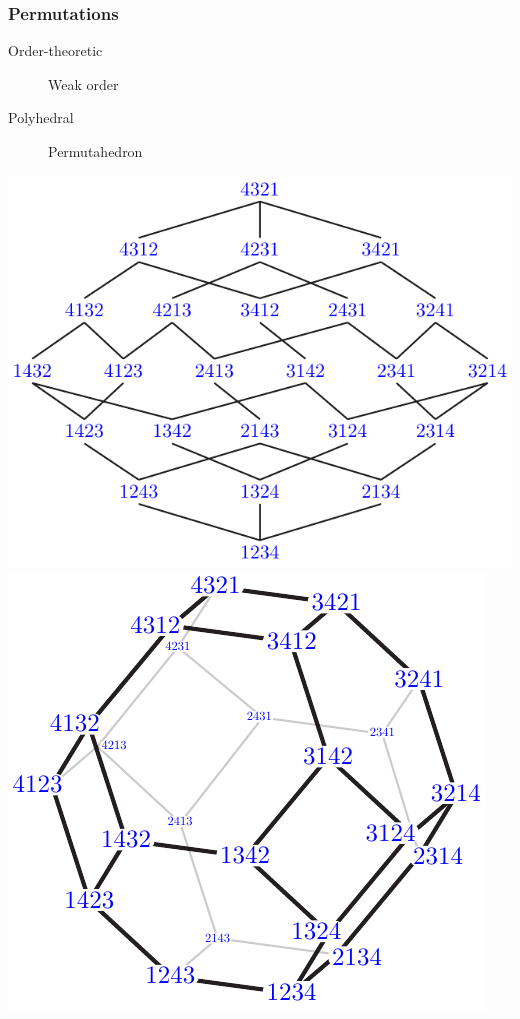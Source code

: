 \documentclass[11pt]{beamer}%
\begin{document}
\begin{frame}
  \frametitle{Permutations}
  \begin{description}
  \item[Order-theoretic] Weak order
  \item[Polyhedral] Permutahedron
  \end{description}
    \begin{center}
      \includegraphics[height=.5\textheight]{weakOrderLeft4.pdf}
      \includegraphics[height=.5\textheight]{permutahedronLeft4.pdf}
    \end{center}
\end{frame}
\end{document}
